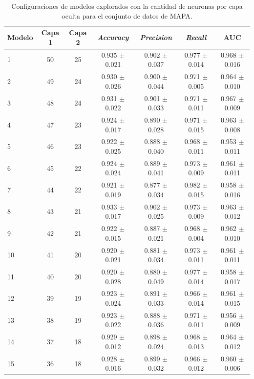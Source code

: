 \begin{table}[H]
	\centering
	\caption[Configuraciones de modelos explorados para el conjunto de datos de MAPA.]{Configuraciones de modelos explorados con la cantidad de neuronas por capa oculta para el conjunto de datos de MAPA.}
	\begin{tabular}{l c c c c c c}    
		\toprule
		\textbf{Modelo} & \textbf{Capa 1} & \textbf{Capa 2} & \textbf{\emph{Accuracy}} & \textbf{\emph{Precision}} & \textbf{\emph{Recall}}  & \textbf{AUC}\\
		\midrule
    
      1 & 50 & 25	& 0.935 $\pm$ 0.021 & 0.902  $\pm$ 0.037	& 0.977  $\pm$ 0.014 & 0.968  $\pm$ 0.016\\
      2 & 49 & 24 & 0.930 $\pm$ 0.026 & 0.900  $\pm$ 0.044 & 0.971  $\pm$ 0.005 & 0.964 $\pm$ 0.010\\
      3 & 48 & 24 & 0.931 $\pm$ 0.022 & 0.901 $\pm$ 0.033 & 0.971 $\pm$ 0.011 & 0.967 $\pm$ 0.009\\
      4 & 47 & 23 & 0.924 $\pm$ 0.017 & 0.890 $\pm$ 0.028 & 0.971 $\pm$ 0.015 & 0.963 $\pm$ 0.008\\
      5 & 46 & 23 & 0.922 $\pm$ 0.025 & 0.888 $\pm$ 0.040 & 0.968 $\pm$ 0.011 & 0.953 $\pm$ 0.011\\
      6 & 45 & 22 & 0.924 $\pm$ 0.024 & 0.889 $\pm$ 0.041 & 0.973 $\pm$ 0.009 & 0.961 $\pm$ 0.011\\ 
      7 & 44 & 22 & 0.921 $\pm$ 0.019 & 0.877 $\pm$ 0.034 & 0.982 $\pm$ 0.015 & 0.958 $\pm$ 0.016\\ 
      8 & 43 & 21 & 0.933 $\pm$ 0.017 & 0.902 $\pm$ 0.025 & 0.973 $\pm$ 0.009 & 0.963 $\pm$ 0.012\\ 
      9 & 42 & 21 & 0.922 $\pm$ 0.015 & 0.887 $\pm$ 0.021 & 0.968 $\pm$ 0.004 & 0.962 $\pm$ 0.010\\ 
      10 & 41 & 20 & 0.920 $\pm$ 0.021 & 0.881 $\pm$ 0.034 & 0.973 $\pm$ 0.011 & 0.961 $\pm$ 0.011\\ 
      11 & 40 & 20 & 0.920 $\pm$ 0.028 & 0.880 $\pm$ 0.049 & 0.977 $\pm$ 0.014 & 0.958 $\pm$ 0.017\\ 
      12 & 39 & 19 & 0.923 $\pm$ 0.024 & 0.891 $\pm$ 0.033 & 0.966 $\pm$ 0.014 & 0.961 $\pm$ 0.015\\ 
      13 & 38 & 19 & 0.923 $\pm$ 0.022 & 0.888 $\pm$ 0.036 & 0.971 $\pm$ 0.011 & 0.956 $\pm$ 0.009\\ 
      14 & 37 & 18 & 0.929 $\pm$ 0.012 & 0.898 $\pm$ 0.024 & 0.968 $\pm$ 0.013 & 0.964 $\pm$ 0.012\\ 
      15 & 36 & 18 & 0.928 $\pm$ 0.016 & 0.899 $\pm$ 0.032 & 0.966 $\pm$ 0.012 & 0.960 $\pm$ 0.006\\ 

\end{tabular}
\end{table}
